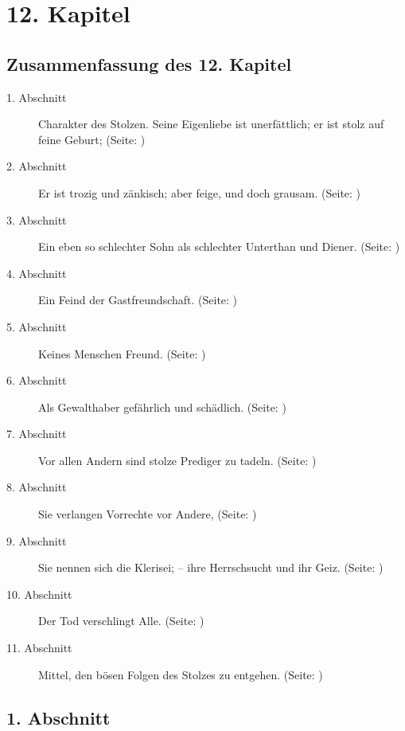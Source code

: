 
\chapter{12. Kapitel} \label{kap12}

\section{Zusammenfassung des 12. Kapitel}
\small
\begin{description}
\item[1. Abschnitt] Charakter des Stolzen. Seine Eigenliebe ist unerfättlich; er
ist stolz auf feine Geburt; (Seite: \pageref{kap12_ab1})
\item[2. Abschnitt] Er ist trozig und zänkisch; aber feige, und doch grausam. (Seite: \pageref{kap12_ab2})
\item[3. Abschnitt] Ein eben so schlechter Sohn als schlechter Unterthan und
Diener. (Seite: \pageref{kap12_ab3})
\item[4. Abschnitt] Ein Feind der Gastfreundschaft. (Seite: \pageref{kap12_ab4})
\item[5. Abschnitt] Keines Menschen Freund. (Seite: \pageref{kap12_ab5})
\item[6. Abschnitt] Als Gewalthaber gefährlich und schädlich. (Seite: \pageref{kap12_ab6})
\item[7. Abschnitt] Vor allen Andern sind stolze Prediger zu tadeln. (Seite: \pageref{kap12_ab7})
\item[8. Abschnitt] Sie verlangen Vorrechte vor Andere, (Seite: \pageref{kap12_ab8})
\item[9. Abschnitt] Sie nennen sich die Klerisei; -- ihre Herrschsucht und ihr
Geiz. (Seite: \pageref{kap12_ab9})
\item[10. Abschnitt] Der Tod verschlingt Alle. (Seite: \pageref{kap12_ab10})
\item[11. Abschnitt] Mittel, den bösen Folgen des Stolzes zu entgehen. (Seite: \pageref{kap12_ab11})
\end{description}
\normalsize

\section{1. Abschnitt} \label{kap12_ab1}


